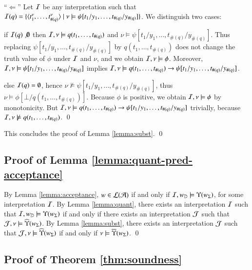     \noindent``$\Leftarrow$'' Let $\mathcal{I}$ be any interpretation such that
    $\mathcal{I}(q) = \{ \langle t_1^\nu, \ldots, t_{\#(q)}^\nu \rangle \mid \nu
      \models \psi[t_1/y_1,\ldots,t_{\#(q)}/y_{\#(q)}] \}$. We
    distinguish two cases: \begin{compactitem}
    \item if $\mathcal{I}(q) \not \emptyset$ then $\mathcal{I},\nu \models
      q(t_1,\ldots,t_{\#(q)})$ and $\nu \models \psi[t_1/y_1, \ldots,
        t_{\#(q)}/y_{\#(q)}]$. Thus replacing $\psi[t_1/y_1, \ldots,
        t_{\#(q)}/y_{\#(q)}]$ by $q(t_1,\ldots,t_{\#(q)})$ does not
      change the truth value of $\phi$ under $\mathcal{I}$ and $\nu$, and we
      obtain $\mathcal{I},\nu \models \phi$. Moreover, $\mathcal{I},\nu \models
      \psi[t_1/y_1, \ldots, t_{\#(q)}/y_{\#(q)}]$ implies $\mathcal{I},\nu
      \models q(t_1,\ldots,t_{\#(q)}) \rightarrow \psi[t_1/y_1,
        \ldots, t_{\#(q)}/y_{\#(q)}]$.
    \item else $\mathcal{I}(q) = \emptyset$, hence $\nu \not\models
      \psi[t_1/y_1, \ldots, t_{\#(q)}/y_{\#(q)}]$, thus $\nu \models
      \phi[\bot/q(t_1,\ldots,t_{\#(q)})]$. Because $\phi$ is positive,
      we obtain $\mathcal{I},\nu \models \phi$ by monotonicity. But $\mathcal{I},\nu
      \models q(t_1,\ldots,t_{\#(q)}) \rightarrow \psi[t_1/y_1,
        \ldots, t_{\#(q)}/y_{\#(q)}]$ trivially, because $\mathcal{I},\nu
      \not\models q(t_1,\ldots,t_{\#(q)})$. \qed
      \end{compactitem}
      
This concludes the proof of Lemma \ref{lemma:subst}. \qed

\subsection{Proof of Lemma \ref{lemma:quant-pred-acceptance}}

By Lemma \ref{lemma:acceptance}, $w \in {\mathcal L}({\mathcal{A}})$ if and only if
$\mathcal{I},{w}_{\mathbb{D}} \models \Upsilon({{w}_\Sigma})$, for some interpretation
$\mathcal{I}$. By Lemma \ref{lemma:quant}, there exists an interpretation $\mathcal{I}$
such that $\mathcal{I},{w}_{\mathbb{D}} \models \Upsilon({{w}_\Sigma})$ if and only if
there exists an interpretation $\mathcal{J}$ such that $\mathcal{J},\nu \models
\widehat{\Upsilon}({{w}_\Sigma})$. By Lemma \ref{lemma:subst}, there exists an
interpretation $\mathcal{J}$ such that $\mathcal{J},\nu \models \widehat{\Upsilon}({{w}_\Sigma})$
if and only if $\nu \models \overline{\Upsilon}({{w}_\Sigma})$. \qed

\subsection{Proof of Theorem \ref{thm:soundness}}

